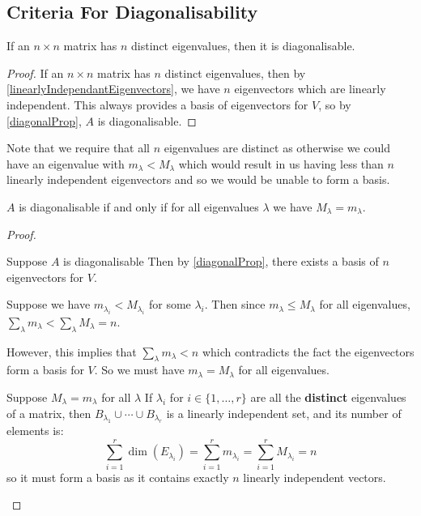 \documentclass[../main.tex]{subfiles}
\begin{document}
\subsection{Criteria For Diagonalisability}
\begin{proposition}
  If an $n \times n$ matrix has $n$ distinct eigenvalues, then it is diagonalisable.
\end{proposition}
\begin{proof}
If an $n \times n$ matrix has $n$ distinct eigenvalues, then by \cref{linearlyIndependantEigenvectors}, we have $n$ eigenvectors which are linearly independent.
This always provides a basis of eigenvectors for $V$, so by \cref{diagonalProp}, $A$ is diagonalisable.
\end{proof}
Note that we require that all $n$ eigenvalues are distinct as otherwise we could have an eigenvalue with $m_\lambda < M_\lambda$ which would result in us having less than $n$ linearly independent eigenvectors and so we would be unable to form a basis.
\begin{proposition}
  $A$ is diagonalisable if and only if for all eigenvalues $\lambda$ we have $M_\lambda = m_\lambda$. \label{diagonalisationIFF}
\end{proposition}
\begin{proof}
  \begin{proofdirection}{Suppose $A$ is diagonalisable}
    Then by \cref{diagonalProp}, there exists a basis of $n$ eigenvectors for $V$.

    Suppose we have $m_{\lambda_i} < M_{\lambda_i}$ for some $\lambda_i$.
    Then since $m_\lambda \leq M_\lambda$ for all eigenvalues, $\sum_{\lambda} m_\lambda < \sum_{\lambda} M_\lambda = n$.

    However, this implies that $\sum_{\lambda} m_\lambda < n$ which contradicts the fact the eigenvectors form a basis for $V$.
    So we must have $m_\lambda = M_\lambda$ for all eigenvalues.
  \end{proofdirection}
  \begin{proofdirection}{Suppose $M_\lambda = m_\lambda$ for all $\lambda$}
    If $\lambda_i$ for $i \in \{1, \ldots, r\}$ are all the \textbf{distinct} eigenvalues of a matrix, then $B_{\lambda_1} \cup \cdots \cup B_{\lambda_r}$ is a linearly independent set, and its number of elements is:
    \[
      \sum_{i = 1}^{r} \dim(E_{\lambda_i}) = \sum_{i = 1}^{r} m_{\lambda_i} = \sum_{i = 1}^{r} M_{\lambda_i} = n
    \]
    so it must form a basis as it contains exactly $n$ linearly independent vectors.
  \end{proofdirection}
\end{proof}
\end{document}

